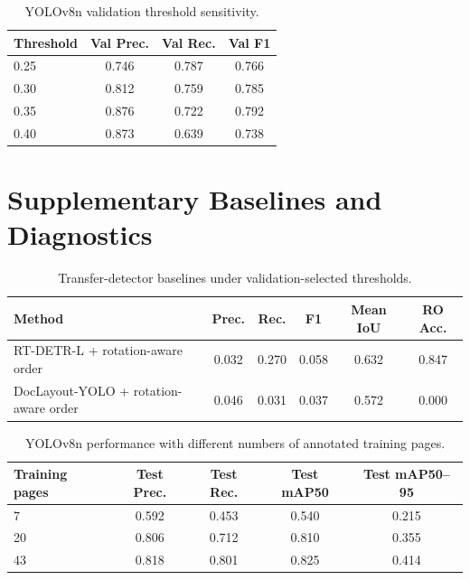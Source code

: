 \documentclass[12pt]{article}
\begin{document}
\begin{table}[h]
\centering
\caption{YOLOv8n validation threshold sensitivity.}
\begin{tabular}{lccc}
\toprule
Threshold & Val Prec. & Val Rec. & Val F1 \\
\midrule
0.25 & 0.746 & 0.787 & 0.766 \\
0.30 & 0.812 & 0.759 & 0.785 \\
0.35 & 0.876 & 0.722 & 0.792 \\
0.40 & 0.873 & 0.639 & 0.738 \\
\bottomrule
\end{tabular}
\end{table}

\section{Supplementary Baselines and Diagnostics}
\begin{table}[h]
\centering
\caption{Transfer-detector baselines under validation-selected thresholds.}
\begin{tabular}{lccccc}
\toprule
Method & Prec. & Rec. & F1 & Mean IoU & RO Acc. \\
\midrule
RT-DETR-L + rotation-aware order & 0.032 & 0.270 & 0.058 & 0.632 & 0.847 \\
DocLayout-YOLO + rotation-aware order & 0.046 & 0.031 & 0.037 & 0.572 & 0.000 \\
\bottomrule
\end{tabular}
\end{table}

\begin{table}[h]
\centering
\caption{Strict-localization comparison at IoU@0.75.}
\end{table}

\begin{table}[h]
\centering
\caption{YOLOv8n performance with different numbers of annotated training pages.}
\begin{tabular}{lcccc}
\toprule
Training pages & Test Prec. & Test Rec. & Test mAP50 & Test mAP50--95 \\
\midrule
7 & 0.592 & 0.453 & 0.540 & 0.215 \\
20 & 0.806 & 0.712 & 0.810 & 0.355 \\
43 & 0.818 & 0.801 & 0.825 & 0.414 \\
\bottomrule
\end{tabular}
\end{table}
\end{document}
